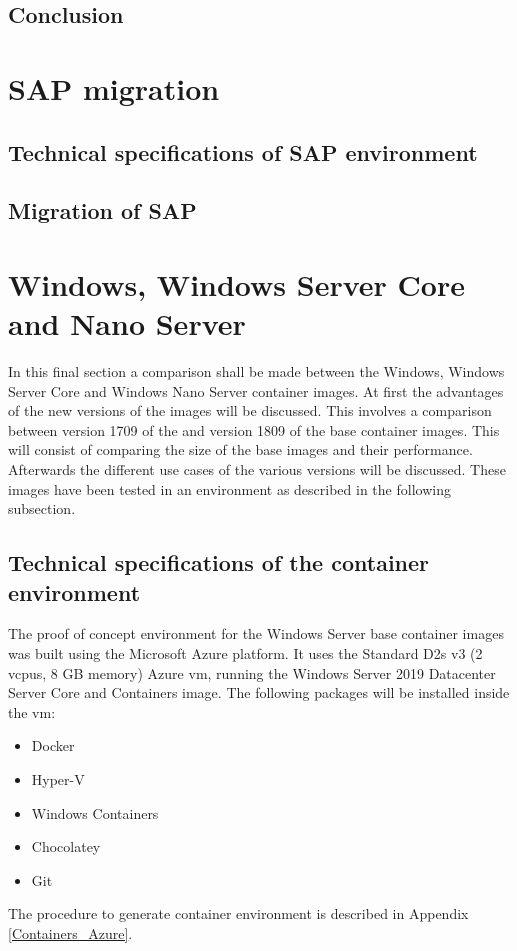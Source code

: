 \subsection{Conclusion}
\clearpage

\section{SAP migration}
\subsection{Technical specifications of SAP environment}
\subsection{Migration of SAP}

\clearpage

\section{Windows, Windows Server Core and Nano Server}
In this final section a comparison shall be made between the Windows, Windows Server Core and Windows Nano Server container images. At first the advantages of the new versions of the images will be discussed. This involves a comparison between version 1709 of the and version 1809 of the base container images. This will consist of comparing the size of the base images and their performance. Afterwards the different use cases of the various versions will be discussed. These images have been tested in an environment as described in the following subsection.

\subsection{Technical specifications of the container environment}
The proof of concept environment for the Windows Server base container images was built using the Microsoft Azure platform. It uses the Standard D2s v3 (2 vcpus, 8 GB memory) Azure \acrshort{vm}, running the Windows Server 2019 Datacenter Server Core and Containers image.
The following packages will be installed inside the \acrshort{vm}:
\begin{itemize}
	\item Docker
	\item Hyper-V
	\item Windows Containers
	\item Chocolatey
	\item Git
\end{itemize}
The procedure to generate container environment is described in Appendix \ref{Containers_Azure}.

